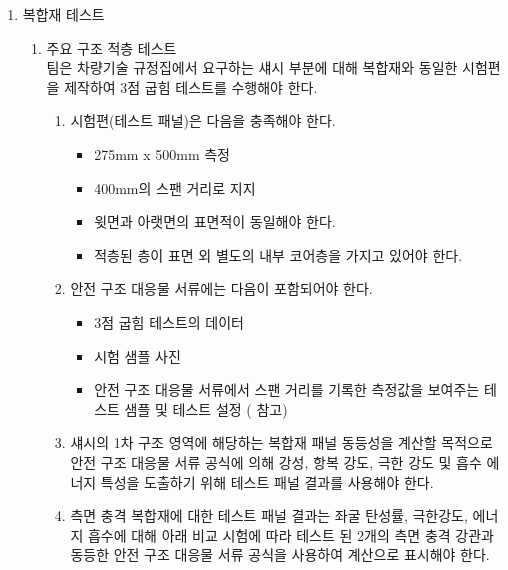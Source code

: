 \documentclass[final,a4paper,10pt]{report}
\begin{document}
\begin{enumerate}
  \item\label{rule:formula-technical.alternative-materials.testing} 복합재 테스트 \label{item:복합재 테스트}
    \begin{enumerate}
      \item\label{rule:formula-technical.alternative-materials.testing.three-point-bend-test} 주요 구조 적층 테스트\\
      팀은 차량기술 규정집에서 요구하는 섀시 부분에 대해 복합재와 동일한 시험편을 제작하여 3점 굽힘 테스트를 수행해야 한다.
        \begin{enumerate}
          \item\label{rule:formula-technical.alternative-materials.testing.three-point-bend-test.test-panel-dimensions} 시험편(테스트 패널)은 다음을 충족해야 한다.
            \begin{itemize}
              \item 275mm x 500mm 측정
              \item 400mm의 스팬 거리로 지지
              \item 윗면과 아랫면의 표면적이 동일해야 한다.
              \item 적층된 층이 표면 외 별도의 내부 코어층을 가지고 있어야 한다.
            \end{itemize}

          \item\label{rule:formula-technical.alternative-materials.testing.three-point-bend-test.test-report-contents} 안전 구조 대응물 서류에는 다음이 포함되어야 한다.
            \begin{itemize}
              \item 3점 굽힘 테스트의 데이터
              \item 시험 샘플 사진
              \item 안전 구조 대응물 서류에서 스팬 거리를 기록한 측정값을 보여주는 테스트 샘플 및 테스트 설정 ( 참고)
            \end{itemize}


          \item\label{rule:formula-technical.alternative-materials.testing.three-point-bend-test.derived-properties} 섀시의 1차 구조 영역에 해당하는 복합재 패널 동등성을 계산할 목적으로 안전 구조 대응물 서류 공식에 의해 강성, 항복 강도, 극한 강도 및 흡수 에너지 특성을 도출하기 위해 테스트 패널 결과를 사용해야 한다.
          \item\label{rule:formula-technical.alternative-materials.testing.three-point-bend-test.steel-tube-equivalency} 측면 충격 복합재에 대한 테스트 패널 결과는 좌굴 탄성률, 극한강도, 에너지 흡수에 대해 아래 비교 시험에 따라 테스트 된 2개의 측면 충격 강관과 동등한 안전 구조 대응물 서류 공식을 사용하여 계산으로 표시해야 한다.
        \end{enumerate}


\end{enumerate}
\end{enumerate}
\end{document}
